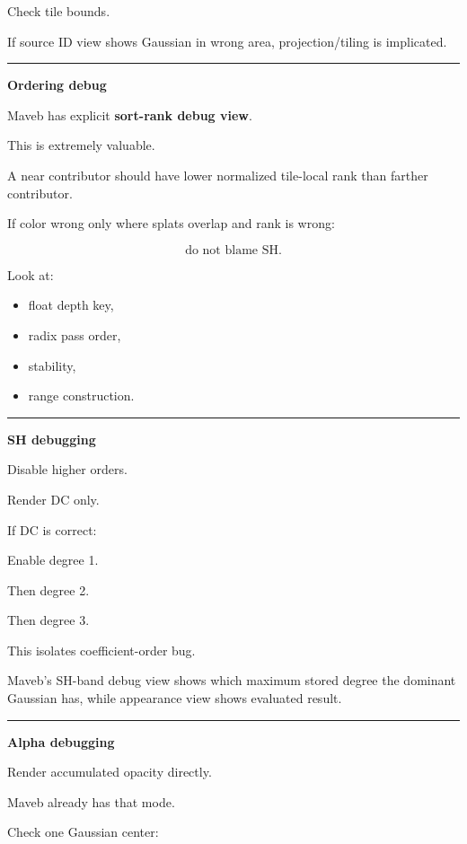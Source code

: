 Check tile bounds.

If source ID view shows Gaussian in wrong area, projection/tiling is implicated.

\begin{center}\rule{0.5\linewidth}{0.5pt}\end{center}

\textbf{Ordering debug}

Maveb has explicit \textbf{sort-rank debug view}.

This is extremely valuable.

A near contributor should have lower normalized tile-local rank than farther contributor.

If color wrong only where splats overlap and rank is wrong:

\[
\boxed{
\text{do not blame SH}.
}
\]

Look at:

\begin{itemize}
\tightlist
\item
  float depth key,
\item
  radix pass order,
\item
  stability,
\item
  range construction.
\end{itemize}

\begin{center}\rule{0.5\linewidth}{0.5pt}\end{center}

\textbf{SH debugging}

Disable higher orders.

Render DC only.

If DC is correct:

Enable degree 1.

Then degree 2.

Then degree 3.

This isolates coefficient-order bug.

Maveb's SH-band debug view shows which maximum stored degree the dominant Gaussian has, while appearance view shows evaluated result.

\begin{center}\rule{0.5\linewidth}{0.5pt}\end{center}

\textbf{Alpha debugging}

Render accumulated opacity directly.

Maveb already has that mode.

Check one Gaussian center:

